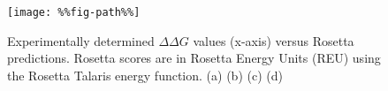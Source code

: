 \begin{figure}
  \texttt{[image: \%\%fig-path\%\%]}
  \caption[]{ %
    Experimentally determined $\Delta\Delta G$ values (x-axis) versus Rosetta predictions.
    Rosetta scores are in Rosetta Energy Units (REU) using the Rosetta Talaris energy function\cite{song_structure-guided_2011,shapovalov_smoothed_2011,omeara_combined_2015}.
    (a) %
    (b) %
    (c) %
    (d) %
  } \label{fig:figure-scatter}
\end{figure}
